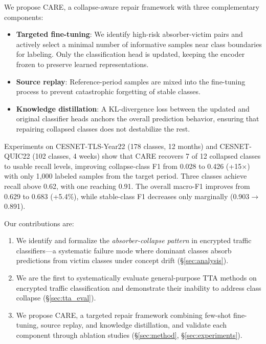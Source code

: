 \documentclass[journal]{IEEEtran}
\newcommand{\ours}{CARE}  %
\begin{document}
We propose \ours{}, a collapse-aware repair framework with three complementary components:
\begin{itemize}
  \item \textbf{Targeted fine-tuning}: We identify high-risk absorber-victim pairs and actively select a minimal number of informative samples near class boundaries for labeling. Only the classification head is updated, keeping the encoder frozen to preserve learned representations.
  \item \textbf{Source replay}: Reference-period samples are mixed into the fine-tuning process to prevent catastrophic forgetting of stable classes.
  \item \textbf{Knowledge distillation}: A KL-divergence loss between the updated and original classifier heads anchors the overall prediction behavior, ensuring that repairing collapsed classes does not destabilize the rest.
\end{itemize}

Experiments on CESNET-TLS-Year22 (178 classes, 12 months) and CESNET-QUIC22 (102 classes, 4 weeks) show that \ours{} recovers 7 of 12 collapsed classes to usable recall levels, improving collapse-class F1 from 0.028 to 0.426 (+15$\times$) with only 1{,}000 labeled samples from the target period.
Three classes achieve recall above 0.62, with one reaching 0.91.
The overall macro-F1 improves from 0.629 to 0.683 (+5.4\%), while stable-class F1 decreases only marginally (0.903$\to$0.891).

Our contributions are:
\begin{enumerate}
  \item We identify and formalize the \textit{absorber-collapse pattern} in encrypted traffic classifiers---a systematic failure mode where dominant classes absorb predictions from victim classes under concept drift (\S\ref{sec:analysis}).
  \item We are the first to systematically evaluate general-purpose TTA methods on encrypted traffic classification and demonstrate their inability to address class collapse (\S\ref{sec:tta_eval}).
  \item We propose \ours{}, a targeted repair framework combining few-shot fine-tuning, source replay, and knowledge distillation, and validate each component through ablation studies (\S\ref{sec:method}, \S\ref{sec:experiments}).
\end{enumerate}


\end{document}
